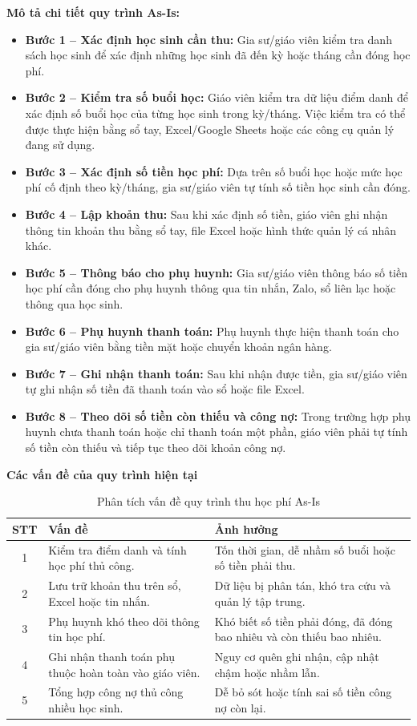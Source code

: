 \noindent \textbf{Mô tả chi tiết quy trình As-Is:}
\begin{itemize}
    \item \textbf{Bước 1 – Xác định học sinh cần thu:} Gia sư/giáo viên kiểm tra danh sách học sinh để xác định những học sinh đã đến kỳ hoặc tháng cần đóng học phí.
    \item \textbf{Bước 2 – Kiểm tra số buổi học:} Giáo viên kiểm tra dữ liệu điểm danh để xác định số buổi học của từng học sinh trong kỳ/tháng. Việc kiểm tra có thể được thực hiện bằng sổ tay, Excel/Google Sheets hoặc các công cụ quản lý đang sử dụng.
    \item \textbf{Bước 3 – Xác định số tiền học phí:} Dựa trên số buổi học hoặc mức học phí cố định theo kỳ/tháng, gia sư/giáo viên tự tính số tiền học sinh cần đóng.
    \item \textbf{Bước 4 – Lập khoản thu:} Sau khi xác định số tiền, giáo viên ghi nhận thông tin khoản thu bằng sổ tay, file Excel hoặc hình thức quản lý cá nhân khác.
    \item \textbf{Bước 5 – Thông báo cho phụ huynh:} Gia sư/giáo viên thông báo số tiền học phí cần đóng cho phụ huynh thông qua tin nhắn, Zalo, sổ liên lạc hoặc thông qua học sinh.
    \item \textbf{Bước 6 – Phụ huynh thanh toán:} Phụ huynh thực hiện thanh toán cho gia sư/giáo viên bằng tiền mặt hoặc chuyển khoản ngân hàng.
    \item \textbf{Bước 7 – Ghi nhận thanh toán:} Sau khi nhận được tiền, gia sư/giáo viên tự ghi nhận số tiền đã thanh toán vào sổ hoặc file Excel.
    \item \textbf{Bước 8 – Theo dõi số tiền còn thiếu và công nợ:} Trong trường hợp phụ huynh chưa thanh toán hoặc chỉ thanh toán một phần, giáo viên phải tự tính số tiền còn thiếu và tiếp tục theo dõi khoản công nợ.
\end{itemize}

\noindent \textbf {Các vấn đề của quy trình hiện tại}
\begin{table}[htbp]
    \centering
    \caption{Phân tích vấn đề quy trình thu học phí As-Is}
    \renewcommand{\arraystretch}{1.5}
    \begin{tabular}{|c|p{5cm}|p{6.5cm}|}
        \hline
        \textbf{STT} & \textbf{Vấn đề} & \textbf{Ảnh hưởng} \\ \hline
        1 & Kiểm tra điểm danh và tính học phí thủ công. & Tốn thời gian, dễ nhầm số buổi hoặc số tiền phải thu. \\ \hline
        2 & Lưu trữ khoản thu trên sổ, Excel hoặc tin nhắn. & Dữ liệu bị phân tán, khó tra cứu và quản lý tập trung. \\ \hline
        3 & Phụ huynh khó theo dõi thông tin học phí. & Khó biết số tiền phải đóng, đã đóng bao nhiêu và còn thiếu bao nhiêu. \\ \hline
        4 & Ghi nhận thanh toán phụ thuộc hoàn toàn vào giáo viên. & Nguy cơ quên ghi nhận, cập nhật chậm hoặc nhầm lẫn. \\ \hline
        5 & Tổng hợp công nợ thủ công nhiều học sinh. & Dễ bỏ sót hoặc tính sai số tiền công nợ còn lại. \\ \hline
    \end{tabular}
\end{table}

